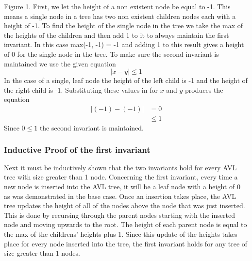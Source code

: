 \documentclass[12pt]{article}
\begin{document}
Figure 1.  First, we let the height of a non existent node be equal to -1.
This means a single node in a tree has two non existent children nodes each
with a height of -1.  To find the height of the single node in the tree we take the max of the
heights of the children and then add 1 to it to always maintain the first
invariant.  In this case max(-1, -1) = -1 and adding 1 to this result gives a
height of 0 for the single node in the tree.  To make sure the second invariant
is maintained we use the given equation
$$
|x-y| \le 1
$$
In the case of a single, leaf node the height of the left child is
-1 and the height of the right child is -1.  Substituting these values in for
$x$ and $y$ produces the equation
\begin{align*}
|(-1)-(-1)| &= 0\\
&\le 1
\end{align*}
Since $0 \le 1$ the second invariant is maintained.
\subsubsection*{Inductive Proof of the first invariant}
Next it must be inductively shown that the two invariants hold for every AVL
tree with size greater than 1 node.  Concerning the first invariant, every time
a new node is inserted into the AVL tree, it will be a leaf node with a height
of 0 as was demonstrated in the base case.  Once an insertion takes place, the
AVL tree updates the height of all of the nodes above the node that was 
just inserted.  This is done by recursing through 
the parent nodes starting with the inserted node and moving upwards to the
root.  The height of each parent node is equal to the max of
the childrens' heights plus 1.  Since this update of the heights takes place for
every node inserted into the tree, the first invariant holds for any tree of
size greater than 1 nodes.\\
\end{document}
